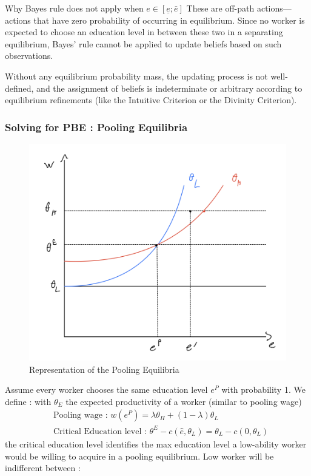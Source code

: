 \documentclass{article}
\begin{document}
\begin{itemize}
\begin{simplebox}{Why Bayes rule does not apply when $e\in[\underline{e};\bar{e}]$}
These are off-path actions—actions that have zero probability of occurring in equilibrium. Since no worker is expected to choose an education level in between these two in a separating equilibrium, Bayes' rule cannot be applied to update beliefs based on such observations.

Without any equilibrium probability mass, the updating process is not well-defined, and the assignment of beliefs is indeterminate or arbitrary according to equilibrium refinements (like the Intuitive Criterion or the Divinity Criterion).
        
    \end{simplebox}
 \end{itemize}


\subsubsection{Solving for PBE : Pooling Equilibria}
\begin{figure}[H]
    \centering
    \includegraphics[width=0.6\linewidth]{pool_eq.png}
    \caption{Representation of the Pooling Equilibria}
    \label{fig:enter-label}
\end{figure}
Assume every worker chooses the same education level $e^P$ with probability 1. We define : with $\theta_E$ the expected productivity of a worker (similar to pooling wage)
\begin{equation}
\begin{aligned}
     &\text{Pooling wage : }w(e^P) = \lambda\theta_H+(1-\lambda)\theta_L\\
     &\text{Critical Education level : }\theta^E-c(\hat{e},\theta_L)=\theta_L-c(0,\theta_L)
\end{aligned}
\end{equation}
 the critical education level identifies the max education level a low-ability worker would be willing to acquire in a pooling equilibrium. Low worker will be indifferent between :
\end{document}
